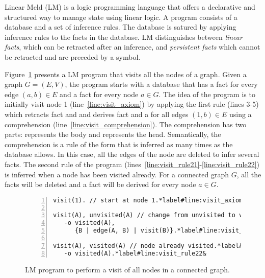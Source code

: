 Linear Meld (LM) is a logic programming language that offers a declarative and
structured way to manage state using linear logic. A program consists of a
database and a set of inference rules. The database is satured by applying
inference rules to the facts in the database. LM distinguishes between
\emph{linear facts}, which can be retracted after an inference, and
\emph{persistent facts} which cannot be retracted and are preceded by a \bang
symbol.

Figure~\ref{code:visit} presents a LM program that visits all the nodes of a
graph. Given a graph $G = (E, V)$, the program starts with a database that has a
fact  for every edge $(a, b) \in E$ and a fact
 for every node $a \in G$. The idea of the program is to
initially visit node 1 (line~\ref{line:visit_axiom}) by applying the first rule
(lines 3-5) which retracts fact  and  and
derives fact  and a  for all edges $(1, b)
\in E$ using a comprehension (line~\ref{line:visit_comprehension}). The
comprehension has two parts:  represents the body and
 represents the head. Semantically, the comprehension is a rule
of the form  that is inferred as many times
as the database allows. In this case, all the edges of the node are deleted to
infer several  facts. The second rule of the program
(lines~\ref{line:visit_rule21}-\ref{line:visit_rule22}) is inferred when a node
has been visited already. For a connected graph $G$, all the 
facts will be deleted and a fact  will be derived for every
node $a \in G$.

\begin{figure}[h]
\begin{Verbatim}[numbers=left,commandchars=\*\#\&,fontsize=\stuffsize,xleftmargin=\stuffleftmargin]
visit(1). // start at node 1.*label#line:visit_axiom&

visit(A), unvisited(A) // change from unvisited to visited.
   -o visited(A),
      {B | edge(A, B) | visit(B)}.*label#line:visit_comprehension&
 
visit(A), visited(A) // node already visited.*label#line:visit_rule21&
   -o visited(A).*label#line:visit_rule22&
\end{Verbatim}
\caption{LM program to perform a visit of all nodes in a connected graph.}
  \label{code:visit}
\end{figure}

